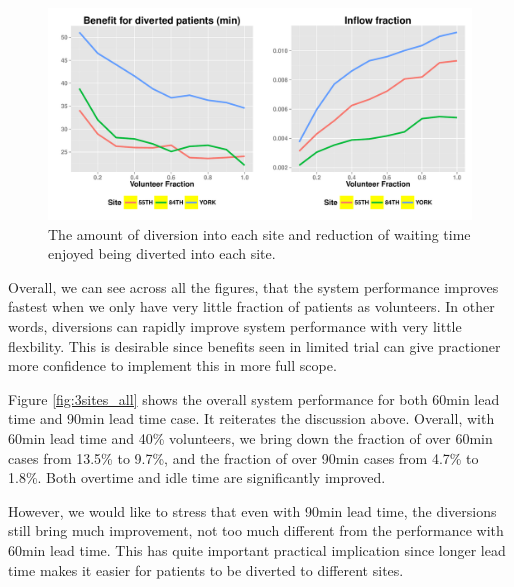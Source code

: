 \begin{figure}[htp]
\centering
\includegraphics[width=.95\textwidth]{chap3/numeric/pic/3sites_gain_flow}
\caption{The amount of diversion into each site and reduction of waiting time
enjoyed being diverted into each site.}
\label{fig:3sites_gain_flow}
\end{figure}

Overall, we can see across all the figures, that the system performance
improves fastest when we only have very little fraction of patients as
volunteers. In other words, diversions can rapidly improve system
performance with very little flexbility. This is desirable since
benefits seen in limited trial can give practioner more confidence
to implement this in more full scope.

Figure \ref{fig:3sites_all} shows the overall system performance for both 60min lead time
and 90min lead time case. It reiterates the discussion above. Overall,
with 60min lead time and 40\% volunteers, we bring down the fraction
of over 60min cases from 13.5\% to 9.7\%, and the fraction of
over 90min cases from 4.7\% to 1.8\%. Both overtime and idle time
are significantly improved.

However, we would like to stress that even with 90min lead time, the diversions
still bring much improvement, not too much different from
the performance with 60min lead time. This has quite important practical
implication since longer lead time makes it easier for patients to be
diverted to different sites.


